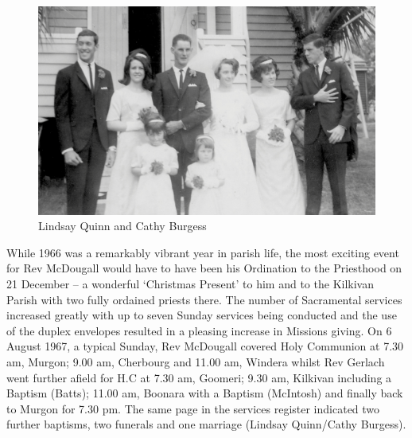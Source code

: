 \begin{figure}[!htb]
\begin{center}
\includegraphics[width=1.\textwidth,center]{../images/LindsayQuinnCathyBurgessWedding.jpg}
\caption{Lindsay Quinn and Cathy Burgess}
\end{center}
\end{figure}




While 1966 was a remarkably vibrant year in parish life, the most exciting event for Rev McDougall would have to have been his Ordination to the Priesthood on 21 December -- a wonderful `Christmas Present' to him and to the Kilkivan Parish with two fully ordained priests there. The number of Sacramental services increased greatly with up to seven Sunday services being conducted and the use of the duplex envelopes resulted in a pleasing increase in Missions giving. On 6 August 1967, a typical Sunday, Rev McDougall covered Holy Communion at 7.30 am, Murgon; 9.00 am, Cherbourg and 11.00 am, Windera whilst Rev Gerlach went further afield for H.C at 7.30 am, Goomeri; 9.30 am, Kilkivan including a Baptism (Batts); 11.00 am, Boonara with a Baptism (McIntosh) and finally back to Murgon for 7.30 pm. The same page in the services register indicated two further baptisms, two funerals and one marriage (Lindsay Quinn/Cathy Burgess).









